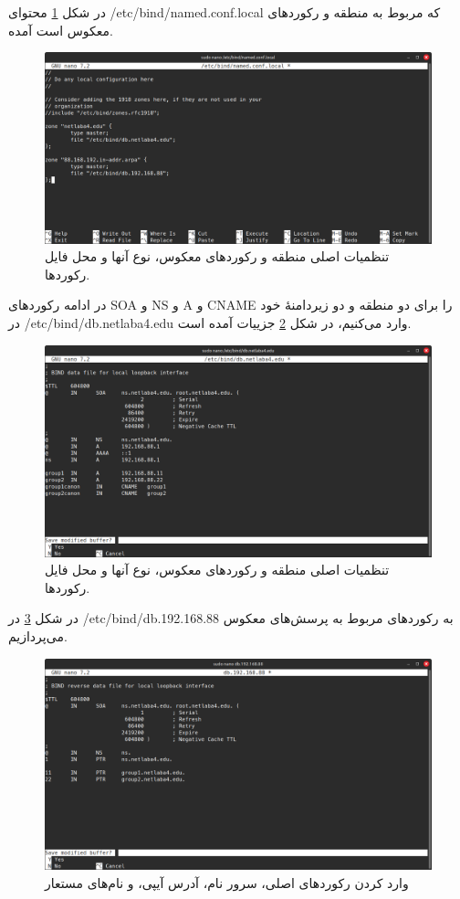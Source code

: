 \documentclass[12pt]{article}
\begin{document}
	در شکل \ref{dns:1} محتوای
	 /etc/bind/named.conf.local
	  که مربوط به منطقه و رکورد‌های معکوس است آمده.
	\begin{figure}[H]
		\centering
		\includegraphics[width=\textwidth]{resources/3.png}
		\caption{تنظمیات اصلی منطقه و رکورد‌های معکوس، نوع آنها و محل فایل رکورد‌ها.}
		\label{dns:1}
	\end{figure}
	در ادامه رکوردهای SOA و NS و A و CNAME را برای دو منطقه و دو زیردامنهٔ خود در
	 /etc/bind/db.netlaba4.edu 
	وارد می‌کنیم، در شکل \ref{dns:2}‌ جزییات آمده است.
	\begin{figure}[H]
		\centering
		\includegraphics[width=\textwidth]{resources/4.png}
		\caption{تنظمیات اصلی منطقه و رکورد‌های معکوس، نوع آنها و محل فایل رکورد‌ها.}
		\label{dns:2}
	\end{figure}
	در شکل \ref{dns:3} در
	 /etc/bind/db.192.168.88
	  به رکورد‌های مربوط به پرسش‌های معکوس می‌پردازیم.
	\begin{figure}[H]
		\centering
		\includegraphics[width=\textwidth]{resources/5.png}
		\caption{وارد کردن رکورد‌های اصلی، سرور نام، آدرس آیپی، و نام‌های مستعار}
		\label{dns:3}
	\end{figure}
\end{document}

